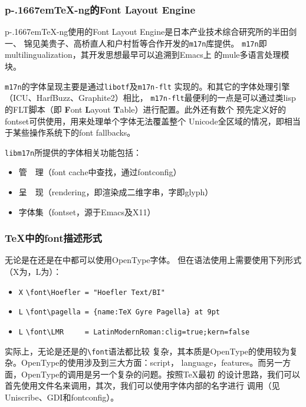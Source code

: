 \documentclass[dvipdfmx]{beamer}
\newcommand{\pTeX}{p\kern-.1667em\TeX}
\newcommand{\ptexng}{\pTeX-ng}
\begin{document}
%
%
%
%
\begin{frame}[fragile]
\frametitle{\ptexng 的Font Layout Engine}
\ptexng 使用的Font Layout Engine是日本产业技术综合研究所的半田剑一、
锦见美贵子、高桥直人和户村哲等合作开发的\texttt{m17n}库提供。
\texttt{m17n}即multilingualization，其开发思想最早可以追溯到Emacs上
的mule多语言处理模块。

\texttt{m17n}的字体呈现主要是通过\texttt{libotf}及\texttt{m17n-flt}
实现的。和其它的字体处理引擎（ICU、HarfBuzz、Graphite2）相比，
\texttt{m17n-flt}最便利的一点是可以通过类lisp的FLT脚本（即
{\bf F}ont {\bf L}ayout {\bf T}able）进行配置。此外还有数个
预先定义好的fontset可供使用，用来处理单个字体无法覆盖整个
Unicode全区域的情况，即相当于某些操作系统下的font fallbacks。

\texttt{libm17n}所提供的字体相关功能包括：

\begin{itemize}
\item 管　理（font cache中查找，通过fontconfig）
\item 呈　现（rendering，即渲染成二维字串，字即glyph）
\item 字体集（fontset，源于Emacs及X11）
\end{itemize}
\end{frame}
%
\begin{frame}[fragile]
\frametitle{\TeX 中的font描述形式}
无论是在还是在中都可以使用OpenType字体。
但在语法使用上需要使用下列形式（X为，L为）：
\begin{itemize}
\item \texttt{X} \verb!\font\Hoefler = "Hoefler Text/BI"!
\item \texttt{L} \verb!\font\pagella = {name:TeX Gyre Pagella} at 9pt!
\item \texttt{L} \verb!\font\LMR     = LatinModernRoman:clig=true;kern=false!
\end{itemize}

实际上，无论是还是的\verb!\font!语法都比较
复杂，其本质是OpenType的使用较为复杂。OpenType的使用涉及到三大方面：script，
language，features。而另一方面，OpenType的调用是另一个复杂的问题。按照\TeX 最初
的设计思路，我们可以首先使用文件名来调用，其次，我们可以使用字体内部的名字进行
调用（见Uniscribe、GDI和fontconfig）。
\end{frame}
\end{document}
